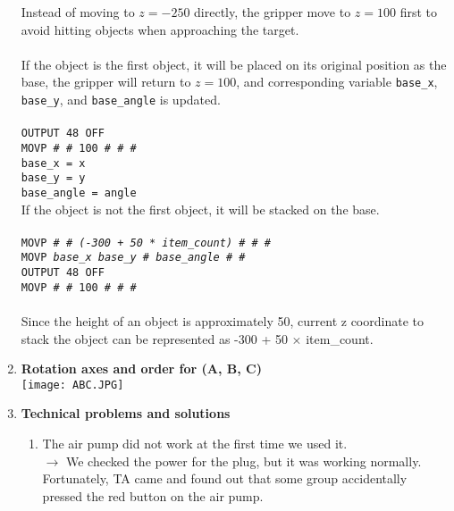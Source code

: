 \documentclass[12pt, a4paper]{article}
\begin{document}
\begin{enumerate}
Instead of moving to $z = -250$ directly, the gripper move to $z = 100$ first to avoid hitting objects when approaching the target. \\
\vspace*{-0.2cm} \\
If the object is the first object, it will be placed on its original position as the base, the gripper will return to $z = 100$, and corresponding variable \texttt{base\_x}, \texttt{base\_y}, and \texttt{base\_angle} is updated. \\
\vspace*{-0.4cm} \\
\texttt{OUTPUT 48 OFF} \\ 
\texttt{MOVP \# \# 100 \# \# \#} \\
\texttt{base\_x = x} \\
\texttt{base\_y = y} \\
\texttt{base\_angle = angle} \\
\newpage
If the object is not the first object, it will be stacked on the base. \\
\vspace*{-0.4cm} \\
\texttt{MOVP \# \# \textit{(-300 + 50 * item\_count)} \# \# \#} \\
\texttt{MOVP \textit{base\_x} \textit{base\_y} \# \textit{base\_angle} \# \#} \\
\texttt{OUTPUT 48 OFF} \\ 
\texttt{MOVP \# \# 100 \# \# \#} \\
\vspace*{-0.4cm} \\
Since the height of an object is approximately 50, current z coordinate to stack the object can be represented as -300 + 50 $\times$ item\_count. 

\item \textbf{Rotation axes and order for (A, B, C)} \\
\texttt{[image: ABC.JPG]} \\

\item \textbf{Technical problems and solutions}
\begin{enumerate}[(1)]

\item The air pump did not work at the first time we used it. \\
$\longrightarrow$ We checked the power for the plug, but it was working normally. Fortunately, TA came and found out that some group accidentally pressed the red button on the air pump. 


\end{enumerate}
\end{enumerate}
\end{document}
